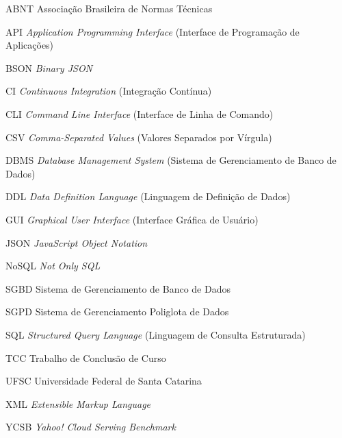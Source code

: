 \documentclass[
  12pt,
  oneside,
  a4paper,
  chapter=TITLE,
  section=TITLE,
  english,
  brazil,
]{abntex2}
\begin{document}

\listoffigures*
\cleardoublepage

\listoftables*
\cleardoublepage

\begin{siglas}
  \item[ABNT] Associação Brasileira de Normas Técnicas
  \item[API] \textit{Application Programming Interface} (Interface de Programação de Aplicações)
  \item[BSON] \textit{Binary JSON}
  \item[CI] \textit{Continuous Integration} (Integração Contínua)
  \item[CLI] \textit{Command Line Interface} (Interface de Linha de Comando)
  \item[CSV] \textit{Comma-Separated Values} (Valores Separados por Vírgula)
  \item[DBMS] \textit{Database Management System} (Sistema de Gerenciamento de Banco de Dados)
  \item[DDL] \textit{Data Definition Language} (Linguagem de Definição de Dados)
  \item[GUI] \textit{Graphical User Interface} (Interface Gráfica de Usuário)
  \item[JSON] \textit{JavaScript Object Notation}
  \item[NoSQL] \textit{Not Only SQL}
  \item[SGBD] Sistema de Gerenciamento de Banco de Dados
  \item[SGPD] Sistema de Gerenciamento Poliglota de Dados
  \item[SQL] \textit{Structured Query Language} (Linguagem de Consulta Estruturada)
  \item[TCC] Trabalho de Conclusão de Curso
  \item[UFSC] Universidade Federal de Santa Catarina
  \item[XML] \textit{Extensible Markup Language}
  \item[YCSB] \textit{Yahoo! Cloud Serving Benchmark}
\end{siglas}

\tableofcontents*
\cleardoublepage

\textual
\end{document}
